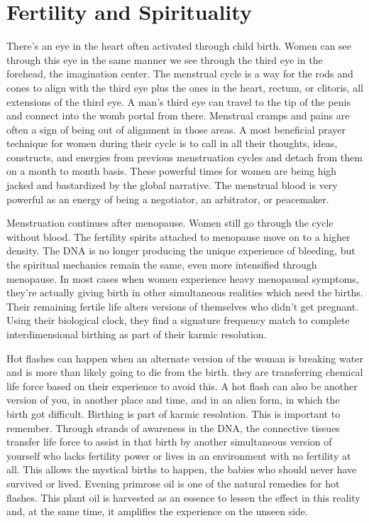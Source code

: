 \documentclass[letterpaper,9pt,twoside,titlepage,onecolumn,openany]{book}
\begin{document}
\section*{Fertility and
Spirituality}\label{fertility-and-spirituality}

There's an eye in the heart often activated through child birth. Women
can see through this eye in the same manner we see through the third eye
in the forehead, the imagination center. The menstrual cycle is a way
for the rods and cones to align with the third eye plus the ones in the
heart, rectum, or clitoris, all extensions of the third eye. A man's
third eye can travel to the tip of the penis and connect into the womb
portal from there. Menstrual cramps and pains are often a sign of being
out of alignment in those areas. A most beneficial prayer technique for
women during their cycle is to call in all their thoughts, ideas,
constructs, and energies from previous menstruation cycles and detach
from them on a month to month basis. These powerful times for women are
being high jacked and bastardized by the global narrative. The menstrual
blood is very powerful as an energy of being a negotiator, an
arbitrator, or peacemaker.

Menstruation continues after menopause. Women still go through the cycle
without blood. The fertility spirits attached to menopause move on to a
higher density. The DNA is no longer producing the unique experience of
bleeding, but the spiritual mechanics remain the same, even more
intensified through menopause. In most cases when women experience heavy
menopausal symptoms, they're actually giving birth in other simultaneous
realities which need the births. Their remaining fertile life alters
versions of themselves who didn't get pregnant. Using their biological
clock, they find a signature frequency match to complete
interdimensional birthing as part of their karmic resolution.

Hot flashes can happen when an alternate version of the woman is
breaking water and is more than likely going to die from the birth. they
are transferring chemical life force based on their experience to avoid
this. A hot flash can also be another version of you, in another place
and time, and in an alien form, in which the birth got difficult.
Birthing is part of karmic resolution. This is important to remember.
Through strands of awareness in the DNA, the connective tissues transfer
life force to assist in that birth by another simultaneous version of
yourself who lacks fertility power or lives in an environment with no
fertility at all. This allows the mystical births to happen, the babies
who should never have survived or lived. Evening primrose oil is one of
the natural remedies for hot flashes. This plant oil is harvested as an
essence to lessen the effect in this reality and, at the same time, it
amplifies the experience on the unseen side.
\end{document}
